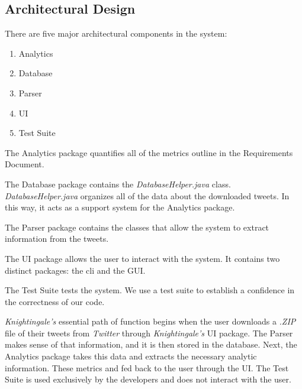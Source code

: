 \documentclass[a4paper, 12pt]{article}
\begin{document}
\subsection{Architectural Design} \label{sec:design}
\begin{adjustwidth}{2em}{0pt}
There are five major architectural components in the system:
\begin{enumerate}
\item Analytics
\item Database
\item Parser
\item UI
\item Test Suite
\end{enumerate}

\noindent The Analytics package quantifies all of the metrics outline in the Requirements Document. \newline

\noindent The Database package contains the \textit{DatabaseHelper.java} class. \textit{DatabaseHelper.java} organizes all of the data about the downloaded tweets. In this way, it acts as a support system for the Analytics package. \newline

\noindent The Parser package contains the classes that allow the system to extract information from the tweets. \newline

\noindent The UI package allows the user to interact with the system. It contains two distinct packages: the cli and the GUI.\newline

\noindent The Test Suite tests the system. We use a test suite to establish a confidence in the correctness of our code. \newline

\noindent \textit{Knightingale's} essential path of function begins when the user downloads a \textit{.ZIP} file of their tweets from \textit{Twitter} through \textit{Knightingale's} UI package. The Parser makes sense of that information, and it is then stored in the database. Next, the Analytics package takes this data and extracts the necessary analytic information. These metrics and fed back to the user through the UI. The Test Suite is used exclusively by the developers and does not interact with the user.
\end{adjustwidth}
\end{document}
